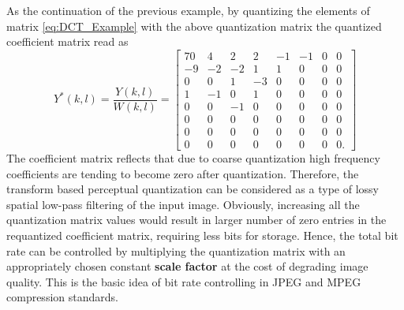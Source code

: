 As the continuation of the previous example, by quantizing the elements of matrix \eqref{eq:DCT_Example} with the above quantization matrix the quantized coefficient matrix read as
\begin{equation}
Y^*(k,l) = \frac{Y(k,l)}{W(k,l)} =
\begin{bmatrix}
    70  &   4  &   2  &   2  &  -1  &  -1  &   0  &   0 \\[0.3em]
    -9  &  -2  &  -2  &   1  &   1  &   0  &   0  &   0 \\[0.3em]
     0  &   0  &   1  &  -3  &   0  &   0  &   0  &   0 \\[0.3em]
     1  &  -1  &   0  &   1  &   0  &   0  &   0  &   0 \\[0.3em]
     0  &   0  &  -1  &   0  &   0  &   0  &   0  &   0 \\[0.3em]
     0  &   0  &   0  &   0  &   0  &   0  &   0  &   0 \\[0.3em]
     0  &   0  &   0  &   0  &   0  &   0  &   0  &   0 \\[0.3em]
     0  &   0  &   0  &   0  &   0  &   0  &   0  &   0.
\end{bmatrix}
\label{eq:quantized_Coef_mx}
\end{equation}
The coefficient matrix reflects that due to coarse quantization high frequency coefficients are tending to become zero after quantization.
Therefore, the transform based perceptual quantization can be considered as a type of lossy spatial low-pass filtering of the input image.
Obviously, increasing all the quantization matrix values would result in larger number of zero entries in the requantized coefficient matrix, requiring less bits for storage.
Hence, the total bit rate can be controlled by multiplying the quantization matrix with an appropriately chosen constant \textbf{scale factor} at the cost of degrading image quality.
This is the basic idea of bit rate controlling in JPEG and MPEG compression standards.


